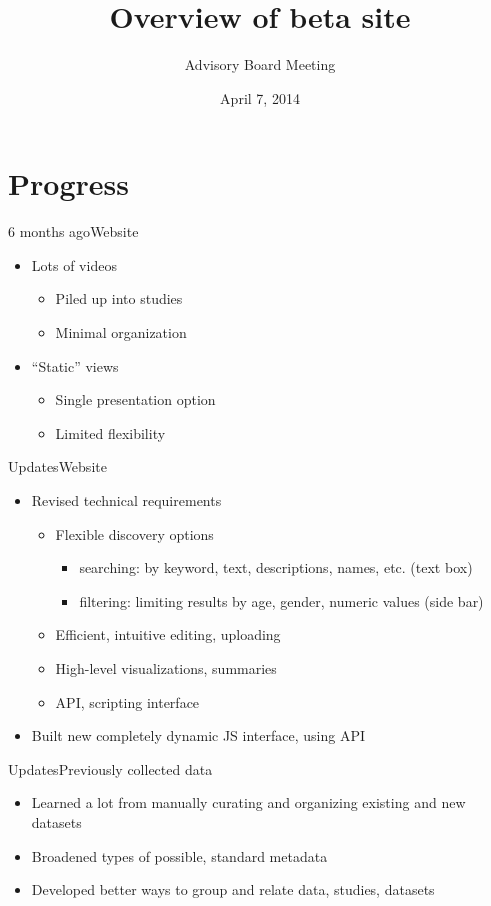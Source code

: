 \documentclass[aspectratio=169,14pt]{beamer}
\title[Advisory Board Meeting]{Overview of beta site}
\subtitle{Advisory Board Meeting}
\institute{Databrary}
\date{April 7, 2014}
\begin{document}
\begin{frame}
	\titlepage
\end{frame}

\section{Progress}

\begin{frame}{6 months ago}{Website}
	\begin{itemize}
		\item	Lots of videos
		\begin{itemize}
			\item Piled up into studies
			\item Minimal organization
		\end{itemize}
		\item	``Static'' views
		\begin{itemize}
			\item Single presentation option
			\item Limited flexibility
		\end{itemize}
	\end{itemize}
\end{frame}

\begin{frame}{Updates}{Website}
	\begin{itemize}
		\item	Revised technical requirements
		\begin{itemize}
			\item Flexible discovery options
			\begin{itemize}
				\item searching: by keyword, text, descriptions, names, etc. (text box)
				\item filtering: limiting results by age, gender, numeric values (side bar)
			\end{itemize}
			\item Efficient, intuitive editing, uploading
			\item High-level visualizations, summaries
			\item API, scripting interface
		\end{itemize}
		\item Built new completely dynamic JS interface, using API
	\end{itemize}
\end{frame}

\begin{frame}{Updates}{Previously collected data}
	\begin{itemize}
		\item Learned a lot from manually curating and organizing existing and new datasets
		\item Broadened types of possible, standard metadata
		\item Developed better ways to group and relate data, studies, datasets
	\end{itemize}
\end{frame}
\end{document}

